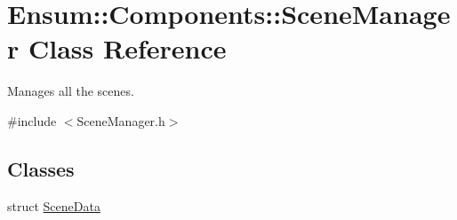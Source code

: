 \hypertarget{class_ensum_1_1_components_1_1_scene_manager}{}\section{Ensum\+:\+:Components\+:\+:Scene\+Manager Class Reference}
\label{class_ensum_1_1_components_1_1_scene_manager}


Manages all the scenes.  




{\ttfamily \#include $<$Scene\+Manager.\+h$>$}

\subsection*{Classes}
\begin{DoxyCompactItemize}
\item 
struct \hyperlink{struct_ensum_1_1_components_1_1_scene_manager_1_1_scene_data}{Scene\+Data}
\end{DoxyCompactItemize}
